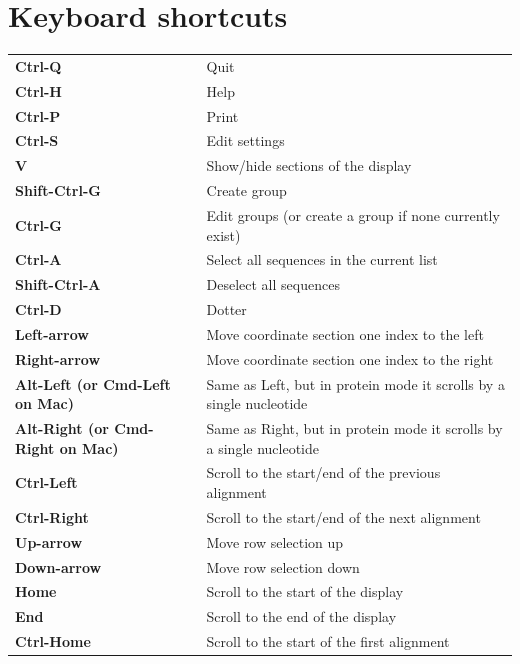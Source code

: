\documentclass[letterpaper]{article}
\begin{document}
{\color[rgb]{0.0,0.27058825,0.5254902}\section[Keyboard shortcuts]{Keyboard shortcuts}}
\hypertarget{RefHeading2701056909880}{}
\bigskip

\begin{flushleft}
\tablehead{}
\begin{supertabular}{p{2.222cm}p{11.729cm}}
\bfseries Ctrl-Q &
 Quit\\
\bfseries Ctrl-H &
 Help\\
\bfseries Ctrl-P &
 Print\\
\bfseries Ctrl-S &
 Edit settings\\
\bfseries V &
 Show/hide sections of the display\\
\bfseries Shift-Ctrl-G &
 Create group\\
\bfseries Ctrl-G &
 Edit groups (or create a group if none
currently exist)\\
\bfseries Ctrl-A &
 Select all sequences in the current list\\
\bfseries Shift-Ctrl-A &
 Deselect all sequences\\
\bfseries Ctrl-D &
 Dotter\\
\bfseries Left-arrow &
 Move coordinate section one index to the
left\footnotemark[2]\\
\bfseries Right-arrow &
 Move coordinate section one index to the
right\footnotemark[2] \\
\bfseries Alt-Left (or Cmd-Left on Mac) &
 Same as Left, but in protein mode it scrolls by
a single nucleotide\\
\bfseries Alt-Right (or Cmd-Right on Mac) &
 Same as Right, but in protein mode it scrolls
by a single nucleotide\\
\bfseries Ctrl-Left &
 Scroll to the start/end of the previous
alignment\footnotemark[3]\\
\bfseries Ctrl-Right &
 Scroll to the start/end of the next
alignment\footnotemark[3] \\
\bfseries Up-arrow &
 Move row selection up \\
\bfseries Down-arrow &
 Move row selection down \ \\
\bfseries Home &
 Scroll to the start of the display\\
\bfseries End &
 Scroll to the end of the display\\
\bfseries Ctrl-Home &
 Scroll to the start of the first
alignment\footnotemark[3] \\

\end{supertabular}
\end{flushleft}
\end{document}

